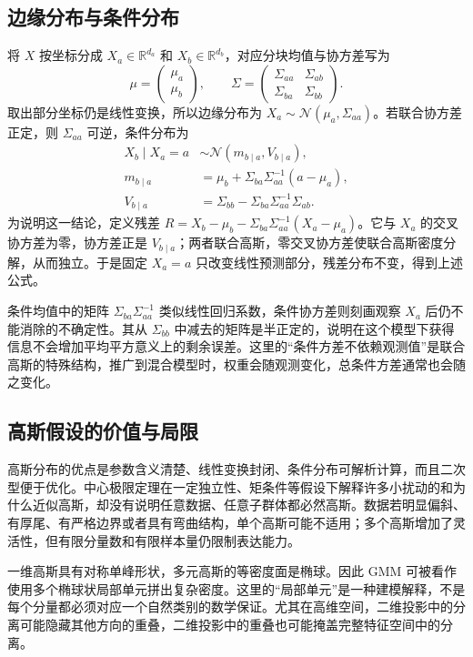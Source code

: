 \documentclass[UTF8]{ctexart}
\begin{document}
\subsection{边缘分布与条件分布}
将 $X$ 按坐标分成 $X_a\in\mathbb R^{d_a}$ 和 $X_b\in\mathbb R^{d_b}$，对应分块均值与协方差写为
\[
\mu=\begin{pmatrix}\mu_a\\\mu_b\end{pmatrix},\qquad
\Sigma=\begin{pmatrix}\Sigma_{aa}&\Sigma_{ab}\\\Sigma_{ba}&\Sigma_{bb}\end{pmatrix}.
\]
取出部分坐标仍是线性变换，所以边缘分布为 $X_a\sim\mathcal N(\mu_a,\Sigma_{aa})$。若联合协方差正定，则 $\Sigma_{aa}$ 可逆，条件分布为
\begin{align}
X_b\mid X_a=a&\sim\mathcal N(m_{b\mid a},V_{b\mid a}),\label{eq:gmm-gaussian-conditional}\\
m_{b\mid a}&=\mu_b+\Sigma_{ba}\Sigma_{aa}^{-1}(a-\mu_a),\nonumber\\
V_{b\mid a}&=\Sigma_{bb}-\Sigma_{ba}\Sigma_{aa}^{-1}\Sigma_{ab}.\nonumber
\end{align}
为说明这一结论，定义残差 $R=X_b-\mu_b-\Sigma_{ba}\Sigma_{aa}^{-1}(X_a-\mu_a)$。它与 $X_a$ 的交叉协方差为零，协方差正是 $V_{b\mid a}$；两者联合高斯，零交叉协方差使联合高斯密度分解，从而独立。于是固定 $X_a=a$ 只改变线性预测部分，残差分布不变，得到上述公式。

条件均值中的矩阵 $\Sigma_{ba}\Sigma_{aa}^{-1}$ 类似线性回归系数，条件协方差则刻画观察 $X_a$ 后仍不能消除的不确定性。其从 $\Sigma_{bb}$ 中减去的矩阵是半正定的，说明在这个模型下获得信息不会增加平均平方意义上的剩余误差。这里的“条件方差不依赖观测值”是联合高斯的特殊结构，推广到混合模型时，权重会随观测变化，总条件方差通常也会随之变化。

\subsection{高斯假设的价值与局限}
高斯分布的优点是参数含义清楚、线性变换封闭、条件分布可解析计算，而且二次型便于优化。中心极限定理在一定独立性、矩条件等假设下解释许多小扰动的和为什么近似高斯，却没有说明任意数据、任意子群体都必然高斯。数据若明显偏斜、有厚尾、有严格边界或者具有弯曲结构，单个高斯可能不适用；多个高斯增加了灵活性，但有限分量数和有限样本量仍限制表达能力。

一维高斯具有对称单峰形状，多元高斯的等密度面是椭球。因此 GMM 可被看作使用多个椭球状局部单元拼出复杂密度。这里的“局部单元”是一种建模解释，不是每个分量都必须对应一个自然类别的数学保证。尤其在高维空间，二维投影中的分离可能隐藏其他方向的重叠，二维投影中的重叠也可能掩盖完整特征空间中的分离。
\end{document}

